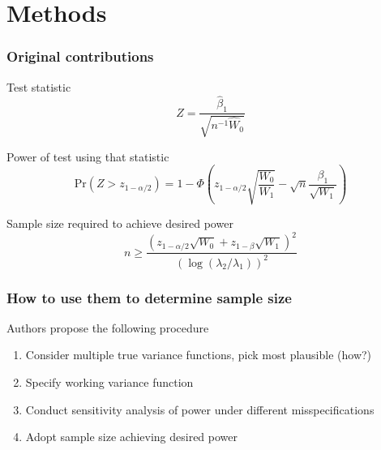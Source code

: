 \documentclass{beamer}
\begin{document}
	     \section{Methods}
\begin{frame}
	\frametitle{Original contributions}
	\begin{block}{Test statistic}
		$$
		Z = \frac{\hat{\beta}_1}{\sqrt{n^{-1} \hat{W}_0}}
		$$
	\end{block}
	\begin{block}{Power of test using that statistic}
		$$
		\mathrm{Pr} \left( Z > z_{1 - \alpha/ 2} \right) 
		=
		1 - \Phi 
		\left(
		z_{1 - \alpha / 2}
		\sqrt{\frac{W_0}{W_1}}
		-
		\sqrt{n}
		\frac{\beta_1}{\sqrt{W_1}}
		\right)
		$$
	\end{block}
	\begin{block}{Sample size required to achieve desired power}
		$$
		n \geq \frac{(z_{1 - \alpha / 2} \sqrt{W_0} + z_{1 - \beta}
		\sqrt{W_1})^2}{\left( \log (\lambda_2 / \lambda_1 ) \right)^2}
		$$
	\end{block}		
\end{frame}
\begin{frame}
	\frametitle{How to use them to determine sample size}
	Authors propose the following procedure
	\begin{enumerate} 
		\item \small Consider multiple true variance functions, pick
			most plausible (how?)
		\item \small Specify working variance function
		\item \small Conduct sensitivity analysis of power under
			different misspecifications
		\item \small Adopt sample size achieving desired power
	\end{enumerate}
\end{frame}
\end{document}
